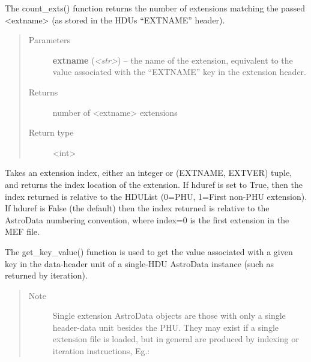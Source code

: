 \documentclass[letterpaper,10pt,english]{sphinxmanual}
\begin{document}
\begin{fulllineitems}
\begin{fulllineitems}
\label{astro_class:astrodata.AstroData.AstroData.count_exts}
The count\_exts() function returns the number of extensions matching the
passed \textless{}extname\textgreater{} (as stored in the HDUs ``EXTNAME'' header).
\begin{quote}\begin{description}
\item[{Parameters}] \leavevmode
\textbf{extname} (\emph{\textless{}str\textgreater{}}) -- the name of the extension, equivalent to the
value associated with the ``EXTNAME'' key in the extension
header.

\item[{Returns}] \leavevmode
number of \textless{}extname\textgreater{} extensions

\item[{Return type}] \leavevmode
\textless{}int\textgreater{}

\end{description}\end{quote}

\end{fulllineitems}


\begin{fulllineitems}
\label{astro_class:astrodata.AstroData.AstroData.ext_index}
Takes an extension index, either an integer or (EXTNAME, EXTVER) 
tuple, and returns the index location of the extension.  If hduref is 
set to True, then the index returned is relative to the HDUList 
(0=PHU, 1=First non-PHU extension). If hduref is False (the default) 
then the index returned is relative to the AstroData numbering 
convention, where index=0 is the first extension in the MEF file.

\end{fulllineitems}


\begin{fulllineitems}
\label{astro_class:astrodata.AstroData.AstroData.get_key_value}
The get\_key\_value() function is used to get the value associated
with a given key in the data-header unit of a single-HDU
AstroData instance (such as returned by iteration).
\begin{quote}\begin{description}
\item[{Note}] \leavevmode
Single extension AstroData objects are those with only a single
header-data unit besides the PHU.  They may exist if a single
extension file is loaded, but in general are produced by indexing or
iteration instructions, Eg.:
\begin{quote}


\end{quote}
\end{description}
\end{quote}
\end{fulllineitems}
\end{fulllineitems}
\end{document}
